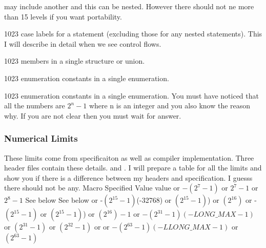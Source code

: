   may include another and this can be nested. However there should not
  ne more than 15 levels if you want portability.
\item 1023 case labels for a  statement (excluding those
  for any nested  statements). This I will describe in
  detail when we see control flows.
\item 1023 members in a single structure or union.
\item 1023 enumeration constants in a single enumeration.
\item 1023 enumeration constants in a single enumeration.
\stopitemize
You must have noticed that all the numbers are $2^n - 1$ where n is an
integer and you also know the reason why. If you are not clear then
you must wait for answer.

\subsubsection{Numerical Limits}
These limits come from specificaiton as well as compiler
implementation. Three header files contain these
details.  and . I will prepare
a table for all the limits and show you if there is a difference
between my headers and specification. I guesss there should not be any.
{\starttable[|l|l|l|]
\HL
\VL Macro \VL Specified Value\VL {} value\VL\SR
\HL
\VL{}\VL\SR
\HL
\VL {} or $-(2^7-1)$\note[1]\VL\SR
\HL
\VL {} or $2^7-1$\VL\SR
\HL
\VL{} or $2^8-1$\VL\SR
\HL
\VL{}\VL See below\note[2]\VL\SR
\HL
\VL{}\VL See below\note[2]\VL\SR
\HL
\VL{}\VL\SR
\HL
\VL {} or -$(2^{15}-1)$\VL(-32768)\VL\SR
\HL
\VL {} or $(2^{15}-1)$)\VL\SR
\HL
\VL {} or $(2^{16})$\VL\SR
\HL
\VL {} or -$(2^{15}-1)$\VL\SR
\HL
\VL {} or $(2^{15}-1)$)\VL\SR
\HL
\VL {} or $(2^{16})-1$\VL\SR
\HL
\VL {} or $−(2^{31} − 1)$\VL$(-LONG\_MAX - 1)$\VL\SR
\HL
\VL {} or $(2^{31}-1)$\VL\SR
\VL\VL{} \VL\SR
\HL
\VL {} or $(2^{32}-1)$ or \VL\SR
\VL\VL{}\VL\SR
\HL
\VL {} or $−(2^{63} − 1)$\VL$(-LLONG\_MAX - 1)$\VL\SR
\HL
\VL {} or $(2^{63}-1)$
\VL\SR
\HL
\VL {}\VL\SR
\HL
\stoptable}
